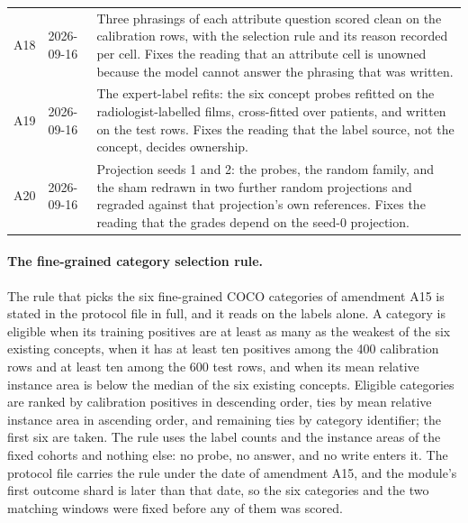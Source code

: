 \documentclass{article}
\begin{document}
\begin{table}[h]
\begin{tabular}{ll>{\raggedright\arraybackslash}p{}}
A18 & 2026-09-16 & Three phrasings of each attribute question scored clean on the calibration rows, with the selection rule and its reason recorded per cell. Fixes the reading that an attribute cell is unowned because the model cannot answer the phrasing that was written. \\
A19 & 2026-09-16 & The expert-label refits: the six concept probes refitted on the radiologist-labelled films, cross-fitted over patients, and written on the test rows. Fixes the reading that the label source, not the concept, decides ownership. \\
A20 & 2026-09-16 & Projection seeds 1 and 2: the probes, the random family, and the sham redrawn in two further random projections and regraded against that projection's own references. Fixes the reading that the grades depend on the seed-0 projection. \\
\bottomrule
\end{tabular}
\end{table}

\FloatBarrier

\paragraph{The fine-grained category selection rule.} The rule that picks the six fine-grained COCO categories of amendment A15 is stated in the protocol file in full, and it reads on the labels alone. A category is eligible when its training positives are at least as many as the weakest of the six existing concepts, when it has at least ten positives among the 400 calibration rows and at least ten among the 600 test rows, and when its mean relative instance area is below the median of the six existing concepts. Eligible categories are ranked by calibration positives in descending order, ties by mean relative instance area in ascending order, and remaining ties by category identifier; the first six are taken. The rule uses the label counts and the instance areas of the fixed cohorts and nothing else: no probe, no answer, and no write enters it. The protocol file carries the rule under the date of amendment A15, and the module's first outcome shard is later than that date, so the six categories and the two matching windows were fixed before any of them was scored.
\end{document}
